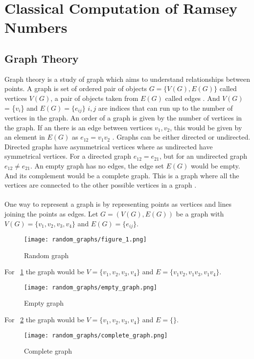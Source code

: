 \documentclass[15pt, a4paper]{Assignment}
\begin{document}
\section{Classical Computation of Ramsey Numbers}
\subsection*{Graph Theory}
Graph theory is a study of graph which aims to understand relationships between points. 
A graph is set of ordered pair of objects $G = \{V(G),E(G)\}$ called vertices $V(G)$, a pair of objects taken from $E(G)$ called edges \cite{BondyMurty2008}.
And $V(G)$ = \{$v_i$\} and $E(G)=\{e_{ij}\}$ $i,j$ are indices that can run up to the number of vertices in the graph. 
An order of a graph is given by the number of vertices in the graph.
If an there is an edge between vertices $v_1 ,v_2$, this would be given by an element in $E(G)$ as $e_{12}=v_1v_2$ \cite{BondyMurty2008}.
Graphs can be either directed or undirected. 
Directed graphs have asymmetrical vertices where as undirected have symmetrical vertices.
For a directed graph $e_{12} = e_{21}$, but for an undirected graph $e_{12} \neq e_{21}$.
An empty graph has no edges, the edge set $E(G)$ would be empty.
And its complement would be a complete graph.
This is a graph where all the vertices are connected to the other possible vertices in a graph \cite{reducible_graph_theory}.
\\\\
One way to represent a graph is by representing points as vertices and lines joining the points as edges.
Let $G = (V(G),E(G))$ be a graph with $V(G) = \{v_1, v_2, v_3, v_4\}$ and $ E(G)=\{e_{ij}\}.$
\begin{figure}[H]
	\centering
	\texttt{[image: random\_graphs/figure\_1.png]}
	\caption{Random graph}
	\label{random_graph}
\end{figure}
For ~\ref{random_graph} the graph would be $V = \{v_1, v_2, v_3, v_4\}$ and $E=\{v_1v_2,v_1v_3,v_1v_4\}.$
\begin{figure}[H]
	\centering
	\texttt{[image: random\_graphs/empty\_graph.png]}
	\caption{Empty graph}
	\label{empty_graph}
\end{figure}
For ~\ref{empty_graph} the graph would be $V = \{v_1, v_2, v_3, v_4\}$ and $E=\{\}.$
\begin{figure}[H]
	\centering
	\texttt{[image: random\_graphs/complete\_graph.png]}
	\caption{Complete graph}
	\label{complete_graph}
\end{figure}
\end{document}

